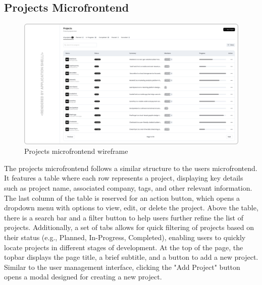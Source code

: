 \subsection{Projects Microfrontend}
\begin{figure}[h]
\centerline{\includegraphics[width=1\textwidth]{images/wireframes/projects.png}}
\caption[Projects microfrontend wireframe]{Projects microfrontend wireframe}
\label{mf:projects}
\end{figure}
The projects microfrontend follows a similar structure to the users microfrontend. It features a table where each row represents a project, displaying key details such as project name, associated company, tags, and other relevant information. The last column of the table is reserved for an action button, which opens a dropdown menu with options to view, edit, or delete the project. Above the table, there is a search bar and a filter button to help users further refine the list of projects. Additionally, a set of tabs allows for quick filtering of projects based on their status (e.g., Planned, In-Progress, Completed), enabling users to quickly locate projects in different stages of development. At the top of the page, the topbar displays the page title, a brief subtitle, and a button to add a new project. Similar to the user management interface, clicking the "Add Project" button opens a modal designed for creating a new project.

